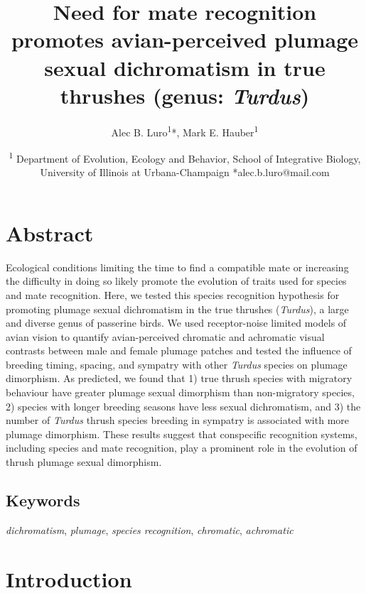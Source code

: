 \documentclass[
  a4paper,
]{article}
\title{Need for mate recognition promotes avian-perceived plumage sexual
dichromatism in true thrushes (genus: \emph{Turdus})}
\author{Alec B. Luro\textsuperscript{1}*, Mark E.
Hauber\textsuperscript{1}}
\date{\textsuperscript{1} Department of Evolution, Ecology and Behavior,
School of Integrative Biology, University of Illinois at
Urbana-Champaign *alec.b.luro@mail.com}
\begin{document}
\maketitle

\hypertarget{abstract}{%
\section{Abstract}\label{abstract}}

Ecological conditions limiting the time to find a compatible mate or
increasing the difficulty in doing so likely promote the evolution of
traits used for species and mate recognition. Here, we tested this
species recognition hypothesis for promoting plumage sexual dichromatism
in the true thrushes (\emph{Turdus}), a large and diverse genus of
passerine birds. We used receptor-noise limited models of avian vision
to quantify avian-perceived chromatic and achromatic visual contrasts
between male and female plumage patches and tested the influence of
breeding timing, spacing, and sympatry with other \emph{Turdus} species
on plumage dimorphism. As predicted, we found that 1) true thrush
species with migratory behaviour have greater plumage sexual dimorphism
than non-migratory species, 2) species with longer breeding seasons have
less sexual dichromatism, and 3) the number of \emph{Turdus} thrush
species breeding in sympatry is associated with more plumage dimorphism.
These results suggest that conspecific recognition systems, including
species and mate recognition, play a prominent role in the evolution of
thrush plumage sexual dimorphism.

\hypertarget{keywords}{%
\subsection{Keywords}\label{keywords}}

\emph{dichromatism}, \emph{plumage}, \emph{species recognition},
\emph{chromatic}, \emph{achromatic}

\hypertarget{introduction}{%
\section{Introduction}\label{introduction}}
\end{document}
